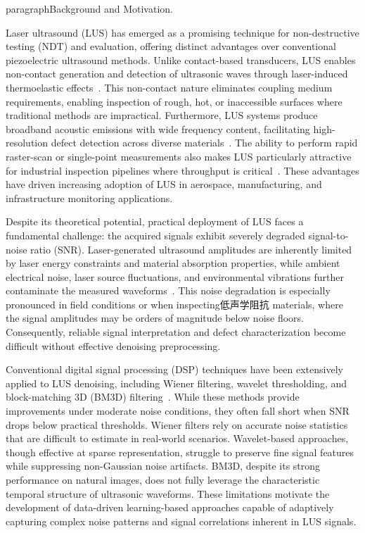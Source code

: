 paragraph{Background and Motivation.}

Laser ultrasound (LUS) has emerged as a promising technique for non-destructive testing (NDT) and evaluation, offering distinct advantages over conventional piezoelectric ultrasound methods. Unlike contact-based transducers, LUS enables non-contact generation and detection of ultrasonic waves through laser-induced thermoelastic effects~\cite{laser_us_ndt}. This non-contact nature eliminates coupling medium requirements, enabling inspection of rough, hot, or inaccessible surfaces where traditional methods are impractical. Furthermore, LUS systems produce broadband acoustic emissions with wide frequency content, facilitating high-resolution defect detection across diverse materials~\cite{laser_us_broadband}. The ability to perform rapid raster-scan or single-point measurements also makes LUS particularly attractive for industrial inspection pipelines where throughput is critical~\cite{laser_us_scanning}. These advantages have driven increasing adoption of LUS in aerospace, manufacturing, and infrastructure monitoring applications.

Despite its theoretical potential, practical deployment of LUS faces a fundamental challenge: the acquired signals exhibit severely degraded signal-to-noise ratio (SNR). Laser-generated ultrasound amplitudes are inherently limited by laser energy constraints and material absorption properties, while ambient electrical noise, laser source fluctuations, and environmental vibrations further contaminate the measured waveforms~\cite{low_snr_challenge}. This noise degradation is especially pronounced in field conditions or when inspecting低声学阻抗 materials, where the signal amplitudes may be orders of magnitude below noise floors. Consequently, reliable signal interpretation and defect characterization become difficult without effective denoising preprocessing.

Conventional digital signal processing (DSP) techniques have been extensively applied to LUS denoising, including Wiener filtering, wavelet thresholding, and block-matching 3D (BM3D) filtering~\cite{wiener_filter,wavelet_denoise,bm3d_denoise}. While these methods provide improvements under moderate noise conditions, they often fall short when SNR drops below practical thresholds. Wiener filters rely on accurate noise statistics that are difficult to estimate in real-world scenarios. Wavelet-based approaches, though effective at sparse representation, struggle to preserve fine signal features while suppressing non-Gaussian noise artifacts. BM3D, despite its strong performance on natural images, does not fully leverage the characteristic temporal structure of ultrasonic waveforms. These limitations motivate the development of data-driven learning-based approaches capable of adaptively capturing complex noise patterns and signal correlations inherent in LUS signals.
